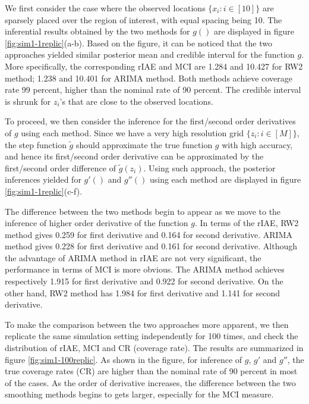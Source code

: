 \documentclass{article}
\begin{document}
We first consider the case where the observed locations $\{x_i: i \in [10] \}$ are sparsely placed over the region of interest, with equal spacing being 10. The inferential results obtained by the two methods for $g()$ are displayed in figure \ref{fig:sim1-1replic}(a-b). Based on the figure, it can be noticed that the two approaches yielded similar posterior mean and credible interval for the function $g$. More specifically, the corresponding rIAE and MCI are 1.284 and 10.427 for RW2 method; 1.238 and 10.401 for ARIMA method. Both methods achieve coverage rate 99 percent, higher than the nominal rate of 90 percent. The credible interval is shrunk for $z_i$'s that are close to the observed locations.

To proceed, we then consider the inference for the first/second order derivatives of $g$ using each method. Since we have a very high resolution grid $\{z_i: i\in [M]\}$, the step function $\tilde{g}$ should approximate the true function $g$ with high accuracy, and hence its first/second order derivative can be approximated by the first/second order difference of $\tilde{g}(z_i)$. Using such approach, the posterior inferences yielded for $g'()$ and $g''()$ using each method are displayed in figure \ref{fig:sim1-1replic}(c-f). 

The difference between the two methods begin to appear as we move to the inference of higher order derivative of the function $g$. In terms of the rIAE, RW2 method gives 0.259 for first derivative and 0.164 for second derivative. ARIMA method gives 0.228 for first derivative and 0.161 for second derivative. Although the advantage of ARIMA method in rIAE are not very significant, the performance in terms of MCI is more obvious. The ARIMA method achieves respectively 1.915 for first derivative and 0.922 for second derivative. On the other hand, RW2 method has 1.984 for first derivative and 1.141 for second derivative.

To make the comparison between the two approaches more apparent, we then replicate the same simulation setting independently for 100 times, and check the distribution of rIAE, MCI and CR (coverage rate). The results are summarized in figure \ref{fig:sim1-100replic}. As shown in the figure, for inference of $g$, $g'$ and $g''$, the true coverage rates (CR) are higher than the nominal rate of 90 percent in most of the cases. As the order of derivative increases, the difference between the two smoothing methods begins to gets larger, especially for the MCI measure. 
\end{document}

